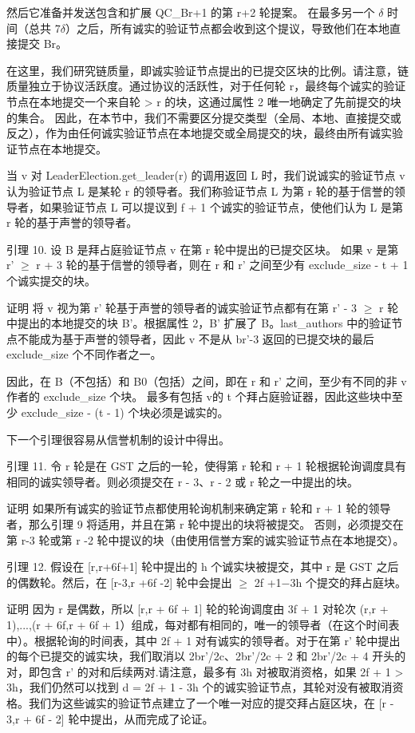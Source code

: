 然后它准备并发送包含和扩展 QC\_Br+1 的第 r+2 轮提案。 在最多另一个 $\delta$ 时间（总共 7$\delta$）之后，所有诚实的验证节点都会收到这个提议，导致他们在本地直接提交 Br。

在这里，我们研究链质量，即诚实验证节点提出的已提交区块的比例。请注意，链质量独立于协议活跃度。通过协议的活跃性，对于任何轮 r，最终每个诚实的验证节点在本地提交一个来自轮 > r 的块，这通过属性 2 唯一地确定了先前提交的块的集合。 因此，在本节中，我们不需要区分提交类型（全局、本地、直接提交或反之），作为由任何诚实验证节点在本地提交或全局提交的块，最终由所有诚实验证节点在本地提交。

当 v 对 LeaderElection.get\_leader(r) 的调用返回 L 时，我们说诚实的验证节点 v 认为验证节点 L 是某轮 r 的领导者。我们称验证节点 L 为第 r 轮的基于信誉的领导者，如果验证节点 L 可以提议到 f + 1 个诚实的验证节点，使他们认为 L 是第 r 轮的基于声誉的领导者。

引理 10. 设 B 是拜占庭验证节点 v 在第 r 轮中提出的已提交区块。 如果 v 是第 r' $\geq$ r + 3 轮的基于信誉的领导者，则在 r 和 r' 之间至少有 exclude\_size - t + 1 个诚实提交的块。

证明 将 v 视为第 r' 轮基于声誉的领导者的诚实验证节点都有在第 r' - 3 $\geq$ r 轮中提出的本地提交的块 B'。根据属性 2，B' 扩展了 B。last\_authors 中的验证节点不能成为基于声誉的领导者，因此 v 不是从 br'-3 返回的已提交块的最后 exclude\_size 个不同作者之一。

因此，在 B（不包括）和 B0（包括）之间，即在 r 和 r' 之间，至少有不同的非 v 作者的 exclude\_size 个块。 最多有包括 v的 t 个拜占庭验证器，因此这些块中至少 exclude\_size - (t - 1) 个块必须是诚实的。

下一个引理很容易从信誉机制的设计中得出。

引理 11. 令 r 轮是在 GST 之后的一轮，使得第 r 轮和 r + 1 轮根据轮询调度具有相同的诚实领导者。则必须提交在 r - 3、r - 2 或 r 轮之一中提出的块。

证明 如果所有诚实的验证节点都使用轮询机制来确定第 r 轮和 r + 1 轮的领导者，那么引理 9 将适用，并且在第 r 轮中提出的块将被提交。 否则，必须提交在第 r-3 轮或第 r -2 轮中提议的块（由使用信誉方案的诚实验证节点在本地提交）。

引理 12. 假设在 [r,r+6f+1] 轮中提出的 h 个诚实块被提交，其中 r 是 GST 之后的偶数轮。然后，在 [r-3,r +6f -2] 轮中会提出 $\geq$ 2f +1−3h 个提交的拜占庭块。

证明 因为 r 是偶数，所以 [r,r + 6f + 1] 轮的轮询调度由 3f + 1 对轮次 (r,r + 1),...,(r + 6f,r + 6f + 1）组成，每对都有相同的，唯一的领导者（在这个时间表中）。根据轮询的时间表，其中 2f + 1 对有诚实的领导者。对于在第 r' 轮中提出的每个已提交的诚实块，我们取消以 2br'/2c、2br'/2c + 2 和 2br'/2c + 4 开头的对，即包含 r' 的对和后续两对.请注意，最多有 3h 对被取消资格，如果 2f + 1 > 3h，我们仍然可以找到 d = 2f + 1 - 3h 个的诚实验证节点，其轮对没有被取消资格。我们为这些诚实的验证节点建立了一个唯一对应的提交拜占庭区块，在 [r - 3,r + 6f - 2] 轮中提出，从而完成了论证。

